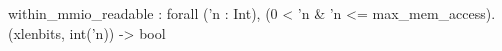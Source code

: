 within_mmio_readable : forall ('n : Int), (0 < 'n & 'n <= max_mem_access). (xlenbits, int('n)) -> bool